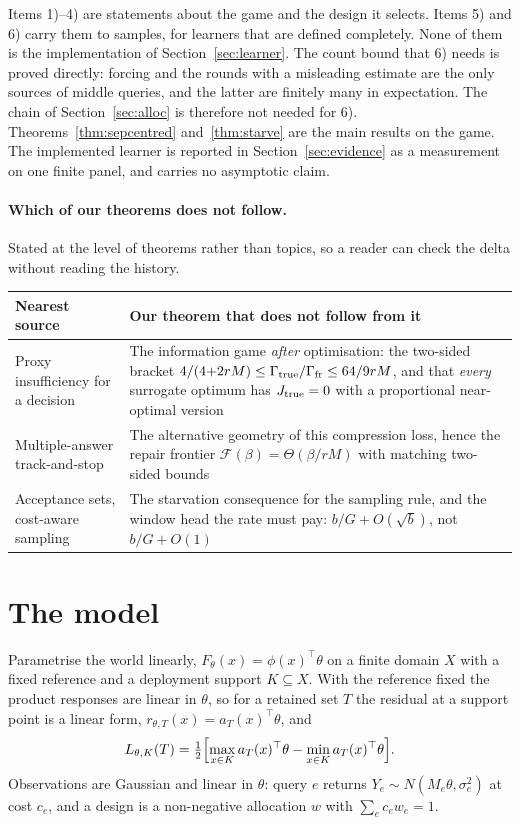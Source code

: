 Items 1)--4) are statements about the game and the design it selects. Items 5) and 6) carry
them to samples, for learners that are defined completely. None of them is the
implementation of Section~\ref{sec:learner}. The count bound that 6) needs is proved
directly: forcing and the rounds with a misleading estimate are the only sources of middle
queries, and the latter are finitely many in expectation. The chain of
Section~\ref{sec:alloc} is therefore not needed for 6). Theorems~\ref{thm:sepcentred}
and~\ref{thm:starve} are the main results on the game. The implemented learner is reported in Section~\ref{sec:evidence} as a measurement on
one finite panel, and carries no asymptotic claim.


\paragraph{Which of our theorems does not follow.}
Stated at the level of theorems rather than topics, so a reader can check the delta without
reading the history.

\begin{table}[h]
\centering
\footnotesize
\begin{tabular}{@{}p{}p{}@{}}
\toprule
Nearest source & Our theorem that does not follow from it \\
\midrule
Proxy insufficiency for a decision & The information game \emph{after} optimisation: the
two-sided bracket $4/(4{+}2rM)\le\Gamma_{\rm true}/\Gamma_{\rm fr}\le 64/9rM$, and that
\emph{every} surrogate optimum has $J_{\rm true}=0$ with a proportional near-optimal version \\
Multiple-answer track-and-stop & The alternative geometry of this compression loss, hence the
repair frontier $\mathcal F(\beta)=\Theta(\beta/rM)$ with matching two-sided bounds \\
Acceptance sets, cost-aware sampling & The starvation consequence for the sampling rule, and
the window head the rate must pay: $b/G+O(\sqrt b)$, not $b/G+O(1)$ \\
\bottomrule
\end{tabular}
\end{table}

\section{The model}
\label{sec:model}

Parametrise the world linearly, $F_{\theta}(x)=\phi(x)^{\top}\theta$ on a finite domain $X$
with a fixed reference and a deployment support $K\subseteq X$. With the reference fixed the
product responses are linear in $\theta$, so for a retained set $T$ the residual at a support
point is a linear form, $r_{\theta,T}(x)=a_{T}(x)^{\top}\theta$, and
\begin{equation}
L_{\theta,K}(T)=\tfrac12\Bigl[\max_{x\in K}a_{T}(x)^{\top}\theta-\min_{x\in K}a_{T}(x)^{\top}\theta\Bigr].
\label{eq:loss}
\end{equation}
Observations are Gaussian and linear in $\theta$: query $e$ returns $Y_{e}\sim N(M_{e}\theta,\sigma_{e}^{2})$
at cost $c_{e}$, and a design is a non-negative allocation $w$ with $\sum_{e}c_{e}w_{e}=1$.

